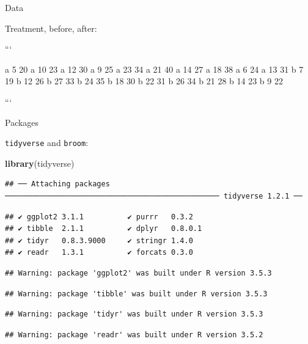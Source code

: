 \documentclass[ignorenonframetext,]{beamer}
\newenvironment{Shaded}{\begin{snugshade}}{\end{snugshade}}
\newcommand{\KeywordTok}[1]{\textcolor[rgb]{0.13,0.29,0.53}{\textbf{#1}}}
\newcommand{\NormalTok}[1]{#1}
\begin{document}
\begin{frame}{Data}
\protect\hypertarget{data}{}

Treatment, before, after:

\begin{multicols}{2}


```

a 5 20
a 10 23
a 12 30
a 9 25
a 23 34
a 21 40
a 14 27
a 18 38
a 6 24
a 13 31
b 7 19
b 12 26
b 27 33
b 24 35
b 18 30
b 22 31
b 26 34
b 21 28
b 14 23
b 9 22

```

\end{multicols}

\end{frame}

\begin{frame}[fragile]{Packages}
\protect\hypertarget{packages-3}{}

\texttt{tidyverse} and \texttt{broom}:

\begin{Shaded}
\begin{Highlighting}[]
\KeywordTok{library}\NormalTok{(tidyverse)}
\end{Highlighting}
\end{Shaded}

\begin{verbatim}
## ── Attaching packages ───────────────────────────────────────────────── tidyverse 1.2.1 ──
\end{verbatim}

\begin{verbatim}
## ✔ ggplot2 3.1.1          ✔ purrr   0.3.2     
## ✔ tibble  2.1.1          ✔ dplyr   0.8.0.1   
## ✔ tidyr   0.8.3.9000     ✔ stringr 1.4.0     
## ✔ readr   1.3.1          ✔ forcats 0.3.0
\end{verbatim}

\begin{verbatim}
## Warning: package 'ggplot2' was built under R version 3.5.3
\end{verbatim}

\begin{verbatim}
## Warning: package 'tibble' was built under R version 3.5.3
\end{verbatim}

\begin{verbatim}
## Warning: package 'tidyr' was built under R version 3.5.3
\end{verbatim}

\begin{verbatim}
## Warning: package 'readr' was built under R version 3.5.2
\end{verbatim}


\end{frame}
\end{document}
